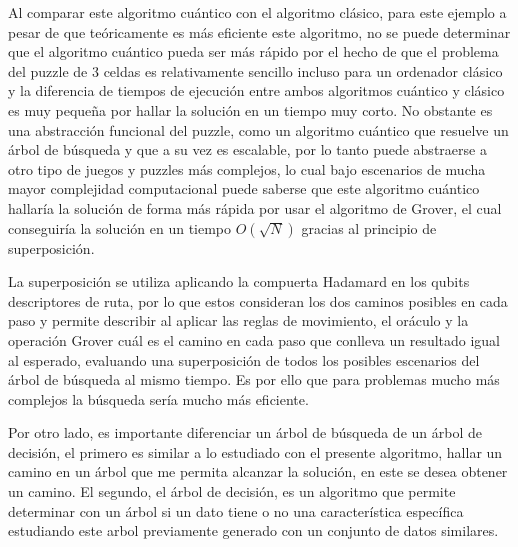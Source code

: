 \documentclass[11pt]{article}
\begin{document}
Al comparar este algoritmo cuántico con el algoritmo clásico, para este
ejemplo a pesar de que teóricamente es más eficiente este algoritmo, no
se puede determinar que el algoritmo cuántico pueda ser más rápido por
el hecho de que el problema del puzzle de 3 celdas es relativamente
sencillo incluso para un ordenador clásico y la diferencia de tiempos de
ejecución entre ambos algoritmos cuántico y clásico es muy pequeña por
hallar la solución en un tiempo muy corto. No obstante es una
abstracción funcional del puzzle, como un algoritmo cuántico que
resuelve un árbol de búsqueda y que a su vez es escalable, por lo tanto
puede abstraerse a otro tipo de juegos y puzzles más complejos, lo cual
bajo escenarios de mucha mayor complejidad computacional puede saberse
que este algoritmo cuántico hallaría la solución de forma más rápida por
usar el algoritmo de Grover, el cual conseguiría la solución en un
tiempo \(O(\sqrt{N})\) gracias al principio de superposición.

La superposición se utiliza aplicando la compuerta Hadamard en los
qubits descriptores de ruta, por lo que estos consideran los dos caminos
posibles en cada paso y permite describir al aplicar las reglas de
movimiento, el oráculo y la operación Grover cuál es el camino en cada
paso que conlleva un resultado igual al esperado, evaluando una
superposición de todos los posibles escenarios del árbol de búsqueda al
mismo tiempo. Es por ello que para problemas mucho más complejos la
búsqueda sería mucho más eficiente.

Por otro lado, es importante diferenciar un árbol de búsqueda de un
árbol de decisión, el primero es similar a lo estudiado con el presente
algoritmo, hallar un camino en un árbol que me permita alcanzar la
solución, en este se desea obtener un camino. El segundo, el árbol de
decisión, es un algoritmo que permite determinar con un árbol si un dato
tiene o no una característica específica estudiando este arbol
previamente generado con un conjunto de datos similares.


    
    
    
\end{document}
